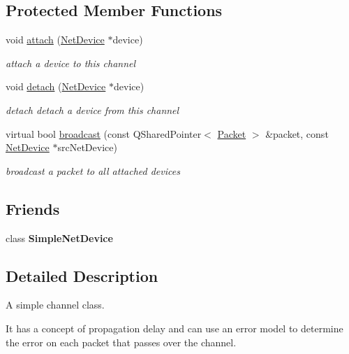 \subsection*{Protected Member Functions}
\begin{DoxyCompactItemize}
\item 
void \hyperlink{classSimpleChannel_aeb89e3c48776ef199dc0a62dbe61b8af}{attach} (\hyperlink{classNetDevice}{Net\+Device} $\ast$device)
\begin{DoxyCompactList}\small\item\em attach a device to this channel \end{DoxyCompactList}\item 
void \hyperlink{classSimpleChannel_a6c16592ec6f763352839f8a75ff0f62a}{detach} (\hyperlink{classNetDevice}{Net\+Device} $\ast$device)
\begin{DoxyCompactList}\small\item\em detach detach a device from this channel \end{DoxyCompactList}\item 
virtual bool \hyperlink{classSimpleChannel_ab8b945de11215700a1577e2956a7e056}{broadcast} (const Q\+Shared\+Pointer$<$ \hyperlink{group__V2XFramework_ga1b82bfc289dbcb9aced56200d7abc964}{Packet} $>$ \&packet, const \hyperlink{classNetDevice}{Net\+Device} $\ast$src\+Net\+Device)
\begin{DoxyCompactList}\small\item\em broadcast a packet to all attached devices \end{DoxyCompactList}\end{DoxyCompactItemize}
\subsection*{Friends}
\begin{DoxyCompactItemize}
\item 
class {\bfseries Simple\+Net\+Device}\hypertarget{classSimpleChannel_ab30aa312df54c87efc3db0b6dee0af5e}{}\label{classSimpleChannel_ab30aa312df54c87efc3db0b6dee0af5e}

\end{DoxyCompactItemize}


\subsection{Detailed Description}
A simple channel class. 

It has a concept of propagation delay and can use an error model to determine the error on each packet that passes over the channel.

